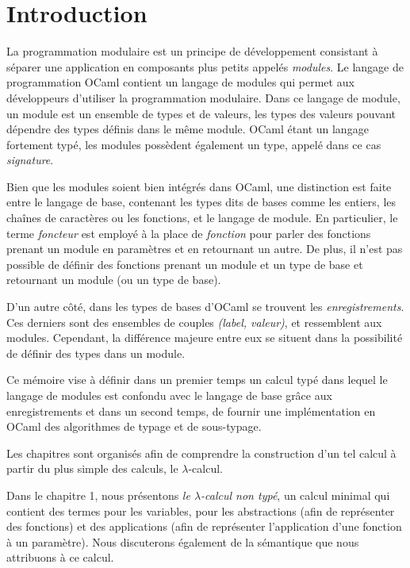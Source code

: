 \chapter{Introduction}

La programmation modulaire est un principe de développement consistant à séparer une
application en composants plus petits appelés \textit{modules}. Le langage de
programmation OCaml contient un langage de modules qui permet aux développeurs
d'utiliser la programmation modulaire. Dans ce langage de module, un module est
un ensemble de types et de valeurs, les types des valeurs pouvant dépendre des
types définis dans le même module.
OCaml étant un langage fortement typé, les modules possèdent également
un type, appelé dans ce cas \textit{signature}.


Bien que les modules soient bien intégrés dans OCaml, une
distinction est faite entre le langage de base, contenant les types dits \og de
bases \fg comme les entiers, les chaînes de caractères ou les fonctions, et le
langage de module. En particulier, le terme \textit{foncteur} est employé à la
place de \textit{fonction} pour parler des fonctions prenant un module en
paramètres et en retournant un autre. De plus, il n'est pas possible de définir
des fonctions prenant un module et un type de base et retournant un module (ou un
type de base).

D'un autre côté, dans les types de bases d'OCaml se trouvent les
\textit{enregistrements}. Ces derniers sont des ensembles de couples
\textit{(label, valeur)}, et ressemblent aux modules. Cependant, la différence
majeure entre eux se situent dans la possibilité de définir des types dans un
module.

Ce mémoire vise à définir dans un premier temps un calcul typé dans lequel le
langage de modules est confondu avec le langage de base grâce aux
enregistrements et dans un second temps, de fournir une implémentation en OCaml
des algorithmes de typage et de sous-typage.


Les chapitres sont organisés afin de comprendre la construction d'un tel calcul
à partir du plus simple des calculs, le $\lambda$-calcul.

Dans le chapitre 1, nous présentons \textit{le $\lambda$-calcul non typé}, un calcul
minimal qui contient des termes pour les variables, pour les abstractions (afin
de représenter des fonctions) et des applications (afin de représenter
l'application d'une fonction à un paramètre). Nous discuterons également de la
sémantique que nous attribuons à ce calcul. 

